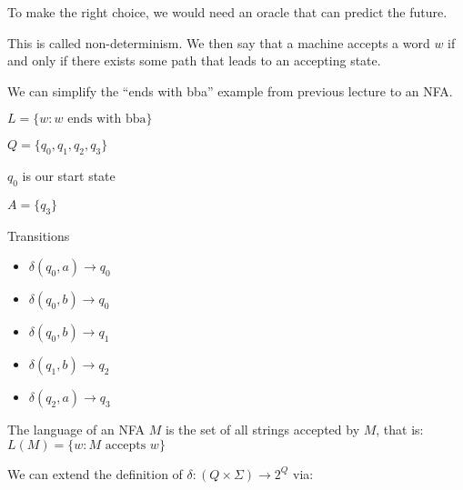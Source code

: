\documentclass{article}
\begin{document}
To make the right choice, we would need an oracle that can predict the
future.

This is called non-determinism. We then say that a machine accepts a
word \(w\) if and only if there exists some path that leads to an
accepting state.

We can simplify the ``ends with bba'' example from previous lecture to
an NFA.

\(L = \{w : w \text{ ends with bba} \}\)

\(Q = \{q_0, q_1, q_2, q_3\}\)

\(q_0\) is our start state

\(A = \{q_3\}\)

Transitions
\begin{itemize}
    \item \(\delta(q_0, a) \to q_0\)
    \item \(\delta(q_0, b) \to q_0\)
    \item \(\delta(q_0, b) \to q_1\)
    \item \(\delta(q_1, b) \to q_2\)
    \item \(\delta(q_2, a) \to q_3\)
\end{itemize}



The language of an NFA \(M\) is the set of all strings accepted by
\(M\), that is: \(L(M) = \{w: M \text{ accepts } w\}\)


We can extend the definition of \(\delta: (Q \times \Sigma) \to 2^Q\)
via:
\end{document}
